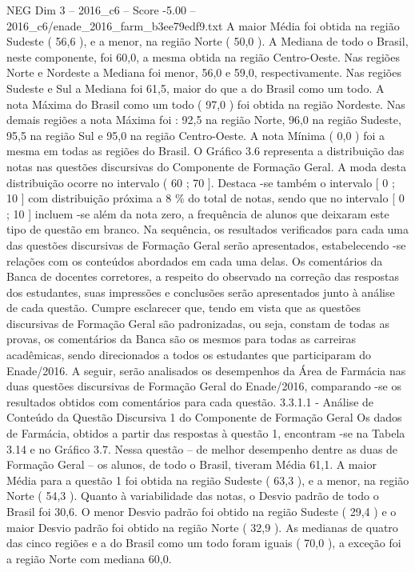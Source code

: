 \begin{textsample}{NEG Dim 3 – 2016\_c6 – Score -5.00 – 2016\_c6/enade\_2016\_farm\_b3ee79edf9.txt}
A maior Média foi obtida na região Sudeste ( 56,6 ), e a menor, na região Norte ( 50,0 ).
A Mediana de todo o Brasil, neste componente, foi 60,0, a mesma obtida na região Centro-Oeste.
Nas regiões Norte e Nordeste a Mediana foi menor, 56,0 e 59,0, respectivamente.
Nas regiões Sudeste e Sul a Mediana foi 61,5, maior do que a do Brasil como um todo.
A nota Máxima do Brasil como um todo ( 97,0 ) foi obtida na região Nordeste.
Nas demais regiões a nota Máxima foi : 92,5 na região Norte, 96,0 na região Sudeste, 95,5 na região Sul e 95,0 na região Centro-Oeste.
A nota Mínima ( 0,0 ) foi a mesma em todas as regiões do Brasil.
O Gráfico 3.6 representa a distribuição das notas nas questões discursivas do Componente de Formação Geral.
A moda desta distribuição ocorre no intervalo ( 60 ; 70 ].
Destaca -se também o intervalo [ 0 ; 10 ] com distribuição próxima a 8 \% do total de notas, sendo que no intervalo [ 0 ; 10 ] incluem -se além da nota zero, a frequência de alunos que deixaram este tipo de questão em branco.
Na sequência, os resultados verificados para cada uma das questões discursivas de Formação Geral serão apresentados, estabelecendo -se relações com os conteúdos abordados em cada uma delas.
Os comentários da Banca de docentes corretores, a respeito do observado na correção das respostas dos estudantes, suas impressões e conclusões serão apresentados junto à análise de cada questão.
Cumpre esclarecer que, tendo em vista que as questões discursivas de Formação Geral são padronizadas, ou seja, constam de todas as provas, os comentários da Banca são os mesmos para todas as carreiras acadêmicas, sendo direcionados a todos os estudantes que participaram do Enade/2016.
A seguir, serão analisados os desempenhos da Área de Farmácia nas duas questões discursivas de Formação Geral do Enade/2016, comparando -se os resultados obtidos com comentários para cada questão. 3.3.1.1 - Análise de Conteúdo da Questão Discursiva 1 do Componente de Formação Geral Os dados de Farmácia, obtidos a partir das respostas à questão 1, encontram -se na Tabela 3.14 e no Gráfico 3.7.
Nessa questão – de melhor desempenho dentre as duas de Formação Geral – os alunos, de todo o Brasil, tiveram Média 61,1.
A maior Média para a questão 1 foi obtida na região Sudeste ( 63,3 ), e a menor, na região Norte ( 54,3 ).
Quanto à variabilidade das notas, o Desvio padrão de todo o Brasil foi 30,6.
O menor Desvio padrão foi obtido na região Sudeste ( 29,4 ) e o maior Desvio padrão foi obtido na região Norte ( 32,9 ).
As medianas de quatro das cinco regiões e a do Brasil como um todo foram iguais ( 70,0 ), a exceção foi a região Norte com mediana 60,0.

\end{textsample}
